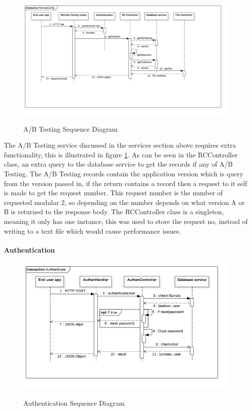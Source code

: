 \begin{figure}[!h]
    \caption{A/B Testing Sequence Diagram}
    \centering
    \includegraphics[width=150mm]{images/sequence/ABTesting}
    \label{fig:ab-seq}
\end{figure} 

The A/B Testing service discussed in the services section above requires extra functionality, this is illustrated in figure \ref{fig:ab-seq}. As can be seen in the RCController class, an extra query to the database service to get the records if any of A/B Testing. The A/B Testing records contain the application version which is query from the version passed in, if the return contains a record then a request to it self is made to get the request number. This request number is the number of requested modular 2, so depending on the number depends on what version A or B is returned to the response body. The RCController class is a singleton, meaning it only has one instance, this was used to store the request no, instead of writing to a text file which would cause performance issues. 

\paragraph{Authentication}

\begin{figure}[!h]
    \caption{Authentication Sequence Diagram}
    \centering
    \includegraphics[width=150mm]{images/sequence/Authenticate}
    \label{fig:authenticate-seq}
\end{figure}

